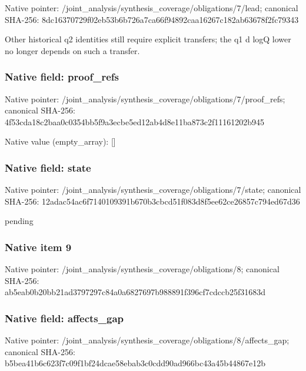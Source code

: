 \documentclass[10pt,a4paper]{article}
\begin{document}
Native pointer: /joint\_analysis/synthesi\allowbreak{}s\_coverage/obligations/7\allowbreak{}/lead; canonical SHA-256: 8dc16370729f02eb53b6b726\allowbreak{}a7ca66f94892caa16267c182\allowbreak{}ab63678f2fc79343


Other historical q2 identities still require explicit transfers; the q1 d logQ lower no longer depends on such a transfer.


\subsubsection{Native field: proof\_refs}


Native pointer: /joint\_analysis/synthesi\allowbreak{}s\_coverage/obligations/7\allowbreak{}/proof\_refs; canonical SHA-256: 4f53cda18c2baa0c0354bb5f\allowbreak{}9a3ecbe5ed12ab4d8e11ba87\allowbreak{}3c2f11161202b945



Native value (empty\_array): []



\subsubsection{Native field: state}


Native pointer: /joint\_analysis/synthesi\allowbreak{}s\_coverage/obligations/7\allowbreak{}/state; canonical SHA-256: 12adac54ac6f7140109391b6\allowbreak{}70b3cbcd51f083d8f5ee62ce\allowbreak{}26857c794ed67d36


pending


\subsubsection{Native item 9}


Native pointer: /joint\_analysis/synthesi\allowbreak{}s\_coverage/obligations/8; canonical SHA-256: ab5eab0b20bb21ad3797297c\allowbreak{}84a0a6827697b988891f396c\allowbreak{}f7cdccb25f31683d



\subsubsection{Native field: affects\_gap}


Native pointer: /joint\_analysis/synthesi\allowbreak{}s\_coverage/obligations/8\allowbreak{}/affects\_gap; canonical SHA-256: b5bea41b6c623f7c09f1bf24\allowbreak{}dcae58ebab3c0cdd90ad966b\allowbreak{}c43a45b44867e12b
\end{document}
